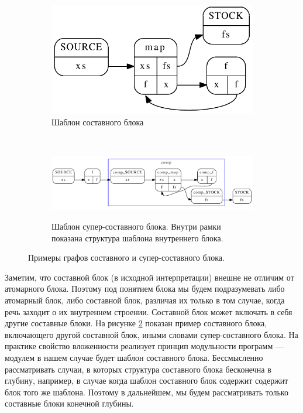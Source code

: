 \documentclass[10pt,a4paper]{article}
\begin{document}
\begin{figure}[H]
  \centering
  \begin{subfigure}[b]{0.3\textwidth}
    \centering
    \label{example:composite}
    \includegraphics[width=\textwidth]{example_cg.pdf}
    \caption{Шаблон составного блока}
  \end{subfigure}
  ~
  \begin{subfigure}[b]{1.0\textwidth}
    \centering
    \includegraphics[width=\textwidth]{cc_cg.pdf}
    \label{example:supercomposite}
    \caption{Шаблон супер-составного блока. Внутри рамки показана структура шаблона внутреннего блока.}
  \end{subfigure}
  
  \caption{ Примеры графов составного и супер-составного блока.}
  \label{example}
\end{figure}

Заметим, что составной блок (в исходной интерпретации) внешне не отличим от атомарного блока.
Поэтому под понятием блока мы будем подразумевать либо атомарный блок, либо составной блок,
различая их только в том случае, когда речь заходит о их внутреннем строении. Составной блок может включать в себя другие составные блоки.
На рисунке \ref{example:supercomposite} показан пример составного блока, включающего другой составной блок, иными словами супер-составного блока.
На практике свойство вложенности реализует принцип модульности программ --- модулем в нашем случае будет шаблон составного блока.
Бессмысленно рассматривать случаи, в которых структура составного блока бесконечна в глубину, например,
в случае когда шаблон составного блок содержит содержит блок того же шаблона. Поэтому в дальнейшем, мы будем рассматривать только составные блоки конечной глубины.
\end{document}
